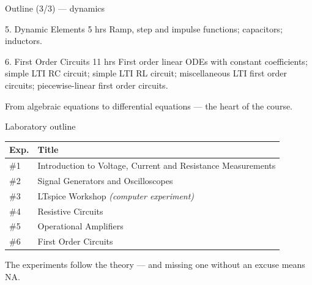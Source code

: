 \documentclass[11pt,aspectratio=169]{beamer}
\begin{document}
\begin{frame}{Outline (3/3) --- dynamics}
  \begin{block}{5. Dynamic Elements \hfill 5 hrs}
    Ramp, step and impulse functions; capacitors; inductors.
  \end{block}
  \begin{block}{6. First Order Circuits \hfill 11 hrs}
    First order linear ODEs with constant coefficients; simple LTI RC circuit;
    simple LTI RL circuit; miscellaneous LTI first order circuits;
    piecewise-linear first order circuits.
  \end{block}
  \vfill
  \centering\small\color{metugray}
  From algebraic equations to differential equations --- the heart of the course.
\end{frame}

\begin{frame}{Laboratory outline}
  \begin{center}
  \begin{tabular}{l L{8.6cm}}
    \toprule
    \textbf{Exp.} & \textbf{Title}\\
    \midrule
    \#1 & Introduction to Voltage, Current and Resistance Measurements\\
    \#2 & Signal Generators and Oscilloscopes\\
    \#3 & LTspice Workshop \textit{(computer experiment)}\\
    \#4 & Resistive Circuits\\
    \#5 & Operational Amplifiers\\
    \#6 & First Order Circuits\\
    \bottomrule
  \end{tabular}
  \end{center}
  \vfill
  \centering\small\color{metugray}
  The experiments follow the theory --- and missing one without an excuse means NA.
\end{frame}
\end{document}
